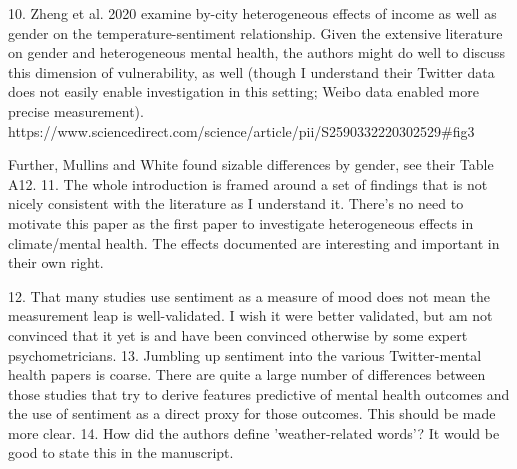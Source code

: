 10. Zheng et al. 2020 examine by-city heterogeneous effects of income as well as gender on the temperature-sentiment relationship. Given the extensive literature on gender and heterogeneous mental health, the authors might do well to discuss this dimension of vulnerability, as well (though I understand their Twitter data does not easily enable investigation in this setting; Weibo data enabled more precise measurement). https://www.sciencedirect.com/science/article/pii/S2590332220302529#fig3

Further, Mullins and White found sizable differences by gender, see their Table A12.
11. The whole introduction is framed around a set of findings that is not nicely consistent with the literature as I understand it. There's no need to motivate this paper as the first paper to investigate heterogeneous effects in climate/mental health. The effects documented are interesting and important in their own right.

12. That many studies use sentiment as a measure of mood does not mean the measurement leap is well-validated. I wish it were better validated, but am not convinced that it yet is and have been convinced otherwise by some expert psychometricians.
13. Jumbling up sentiment into the various Twitter-mental health papers is coarse. There are quite a large number of differences between those studies that try to derive features predictive of mental health outcomes and the use of sentiment as a direct proxy for those outcomes. This should be made more clear.
14. How did the authors define 'weather-related words'? It would be good to state this in the manuscript.

